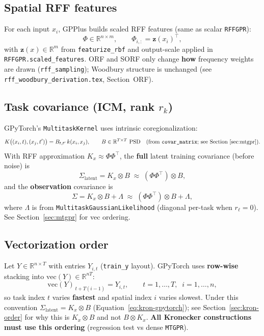\documentclass[11pt]{article}
\theoremstyle{plain}
\newcommand{\Sig}{\Sigma}
\newcommand{\Ph}{\Phi}
\begin{document}
\subsection{Spatial RFF features}

For each input $x_i$, GPPlus builds scaled RFF features (same as scalar \texttt{RFFGPR}):
\begin{equation}
  \label{eq:phi}
  \Ph \in \mathbb{R}^{n \times m},
  \qquad
  \Ph_{i,:} = \mathbf{z}(x_i)^\top,
\end{equation}
with $\mathbf{z}(x) \in \mathbb{R}^{m}$ from \texttt{featurize\_rbf} and output-scale applied in
\texttt{RFFGPR.scaled\_features}.
ORF and SORF only change \textbf{how} frequency weights are drawn (\texttt{rff\_sampling});
Woodbury structure is unchanged (see \texttt{rff\_woodbury\_derivation.tex}, Section~ORF).

\subsection{Task covariance (ICM, rank $r_k$)}

GPyTorch's \texttt{MultitaskKernel} uses intrinsic coregionalization:
\begin{equation}
  \label{eq:icm}
  K\bigl((x_i, t), (x_j, t')\bigr) = B_{t,t'}\, k(x_i, x_j),
  \qquad
  B \in \mathbb{R}^{T \times T}\ \text{PSD}
  \quad\text{(from \texttt{covar\_matrix}; see Section~\ref{sec:mtgpr}).}
\end{equation}
With RFF approximation $K_x \approx \Ph\Ph^\top$,
the \textbf{full} latent training covariance (before noise) is
\begin{equation}
  \label{eq:sigma-mt-latent}
  \Sig_{\mathrm{latent}} = K_x \otimes B
  \;\approx\; (\Ph\Ph^\top) \otimes B,
\end{equation}
and the \textbf{observation} covariance is
\begin{equation}
  \label{eq:sigma-mt}
  \boxed{
    \Sig = K_x \otimes B + \Lambda
    \;\approx\; (\Ph\Ph^\top) \otimes B + \Lambda,
  }
\end{equation}
where $\Lambda$ is from \texttt{MultitaskGaussianLikelihood}
(diagonal per-task when $r_\ell = 0$). See Section~\ref{sec:mtgpr} for vec ordering.

\subsection{Vectorization order}

Let $Y \in \mathbb{R}^{n \times T}$ with entries $Y_{i,t}$ (\texttt{train\_y} layout).
GPyTorch uses \textbf{row-wise} stacking into $\mathrm{vec}(Y) \in \mathbb{R}^{nT}$:
\begin{equation}
  \mathrm{vec}(Y)_{\,t + T(i-1)} = Y_{i,t},
  \qquad
  t = 1,\ldots,T,\;\; i = 1,\ldots,n,
\end{equation}
so task index $t$ varies \textbf{fastest} and spatial index $i$ varies slowest.
Under this convention $\Sig_{\mathrm{latent}} = K_x \otimes B$ (Equation~\eqref{eq:kron-gpytorch});
see Section~\ref{sec:kron-order} for why this is $K_x \otimes B$ and not $B \otimes K_x$.
\textbf{All Kronecker constructions must use this ordering} (regression test vs dense \texttt{MTGPR}).
\end{document}

